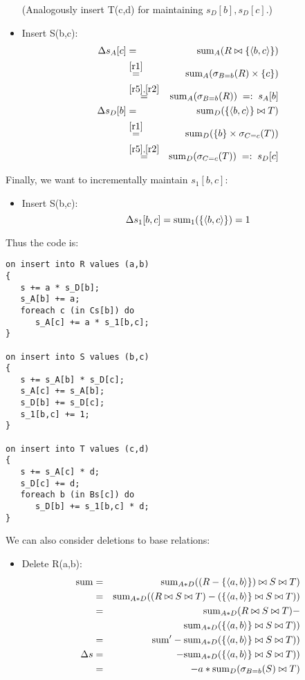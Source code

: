\begin{example}
\begin{itemize}
(Analogously insert T(c,d) for maintaining $s_{D}[b], s_{D}[c]$.)

\item
Insert S(b,c):
\begin{eqnarray*}
\Delta s_A[c] &=&
\mathrm{sum}_{A}(R \bowtie \{{\langle b,c\rangle}\})
\\ &\stackrel{\ref{r1}}{=}&
\mathrm{sum}_{A}(\sigma_{B=b}(R) \times \{c\})
\\ &\stackrel{\ref{r5},\ref{r2}}{=}&
\mathrm{sum}_{A}(\sigma_{B=b}(R))
\;=:\; s_A[b]
\\
\Delta s_D[b] &=&
\mathrm{sum}_{D}(\{{\langle b,c\rangle}\} \bowtie T)
\\ &\stackrel{\ref{r1}}{=}&
\mathrm{sum}_{D}(\{b\} \times \sigma_{C=c}(T))
\\ &\stackrel{\ref{r5},\ref{r2}}{=}&
\mathrm{sum}_{D}(\sigma_{C=c}(T))
\;=:\; s_D[c]
\end{eqnarray*}
\end{itemize}

Finally, we want to incrementally maintain $s_1[b,c]$:
\begin{itemize}
\item
Insert S(b,c):
\[
\Delta s_1[b,c] =
\mathrm{sum}_{1}(\{{\langle b,c\rangle}\}) = 1
\]
\end{itemize}

Thus the code is:
\begin{verbatim}
on insert into R values (a,b)
{
   s += a * s_D[b];
   s_A[b] += a;
   foreach c (in Cs[b]) do
      s_A[c] += a * s_1[b,c];
}

on insert into S values (b,c)
{
   s += s_A[b] * s_D[c];
   s_A[c] += s_A[b];
   s_D[b] += s_D[c];
   s_1[b,c] += 1;
}

on insert into T values (c,d)
{
   s += s_A[c] * d;
   s_D[c] += d;
   foreach b (in Bs[c]) do
      s_D[b] += s_1[b,c] * d;
}
\end{verbatim}
\punto

We can also consider deletions to base relations:

\begin{itemize}
\item
Delete R(a,b):
\begin{eqnarray*}
\mathrm{sum} &=& \mathrm{sum}_{A*D}((R-\{{\langle a,b\rangle}\}) \bowtie S \bowtie T)\\
&=& \mathrm{sum}_{A*D}((R \bowtie S \bowtie T) -
(\{{\langle a,b\rangle}\} \bowtie S \bowtie T))\\
&=& \mathrm{sum}_{A*D}(R \bowtie S \bowtie T) -\\
& & \mathrm{sum}_{A*D}(\{{\langle a,b\rangle}\} \bowtie S \bowtie T))\\
&=& \mathrm{sum}' - \mathrm{sum}_{A*D}(\{{\langle a,b\rangle}\} \bowtie S \bowtie T))\\
\Delta s &=&  - \mathrm{sum}_{A*D}(\{{\langle a,b\rangle}\} \bowtie S \bowtie T))\\
&=& -a*\mathrm{sum}_{D}(\sigma_{B=b}(S) \bowtie T)
\end{eqnarray*} 
\end{itemize}


\end{example}
